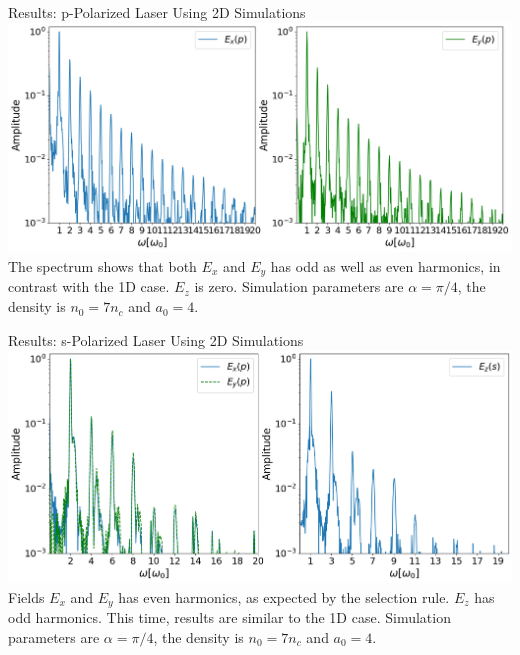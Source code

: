 \documentclass{beamer}
\begin{document}
\begin{frame}{Results: p-Polarized Laser Using 2D Simulations}
    \centering
    \includegraphics[width=1\textwidth]{images/p2d.png}
    \scriptsize{The spectrum shows that both $E_x$ and $E_y$ has odd as well as even harmonics, in contrast with the 1D case. $E_z$ is zero. Simulation parameters are $\alpha = \pi/4$, the density is $n_0 = 7n_c$ and $a_0 = 4$.}
    \label{fig:p2d}
\end{frame}

\begin{frame}{Results: s-Polarized Laser Using 2D Simulations}
    \centering
    \includegraphics[width=1\textwidth]{images/s2d.png}
    \scriptsize{Fields $E_x$ and $E_y$ has even harmonics, as expected by the selection rule. $E_z$ has odd harmonics. This time, results are similar to the 1D case. Simulation parameters are $\alpha = \pi/4$, the density is $n_0 = 7n_c$ and $a_0 = 4$.}
    \label{fig:s2d}
\end{frame}
\end{document}
